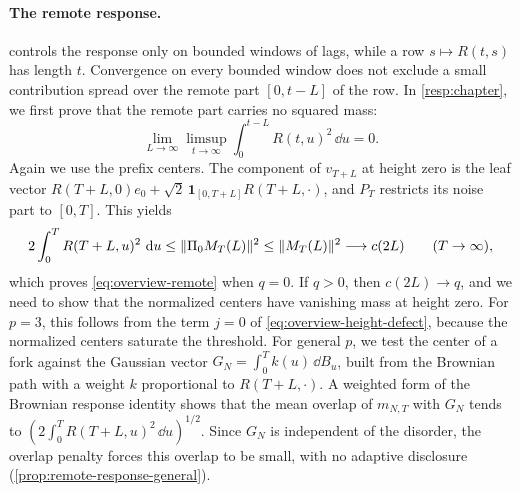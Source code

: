 \paragraph{The remote response.}
 controls the response only on bounded windows of lags, while a row $s\mapsto R(t,s)$ has length $t$. Convergence on every bounded window does not exclude a small contribution spread over the remote part $[0,t-L]$ of the row. In \cref{resp:chapter}, we first prove that the remote part carries no squared mass:
\begin{equation}\label{eq:overview-remote}
 \lim_{L\to\infty}\limsup_{t\to\infty}\int_0^{t-L}R(t,u)^2\,\dd u=0 .
\end{equation}
Again we use the prefix centers. The component of $v_{T+L}$ at height zero is the leaf vector $R(T+L,0)e_0+\sqrt2\,\mathbf1_{[0,T+L]}R(T+L,\cdot)$, and $P_T$ restricts its noise part to $[0,T]$. This yields
\[
 2\int_0^TR(T+L,u)^2\,\mathop{}\!\mathrm d u\le\lVert\Pi_0M_T(L)\rVert^2\le\lVert M_T(L)\rVert^2\longrightarrow c(2L)\qquad(T\to\infty),
\]
which proves \eqref{eq:overview-remote} when $q=0$. If $q>0$, then $c(2L)\to q$, and we need to show that the normalized centers have vanishing mass at height zero. For $p=3$, this follows from the term $j=0$ of \eqref{eq:overview-height-defect}, because the normalized centers saturate the threshold. For general $p$, we test the center of a fork against the Gaussian vector $G_N=\int_0^Tk(u)\,\dd B_u$, built from the Brownian path with a weight $k$ proportional to $R(T+L,\cdot)$. A weighted form of the Brownian response identity shows that the mean overlap of $m_{N,T}$ with $G_N$ tends to $(2\int_0^TR(T+L,u)^2\,\dd u)^{1/2}$. Since $G_N$ is independent of the disorder, the overlap penalty forces this overlap to be small, with no adaptive disclosure (\cref{prop:remote-response-general}).

